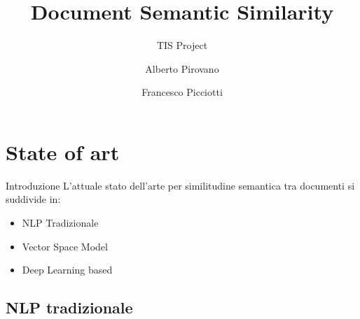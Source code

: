 \documentclass[british]{beamer}
\begin{document}
%
\title[Document Semantic Similarity]
{Document Semantic Similarity}

\subtitle{TIS Project}

\author[A. Pirovano, F. Picciotti]
{Alberto Pirovano \and Francesco Picciotti}





\maketitle

\section{State of art}

\begin{frame}{Introduzione}
	L'attuale stato dell'arte per similitudine semantica tra documenti si suddivide in:
	\begin{itemize}
		\item NLP Tradizionale
		\item Vector Space Model
		\item Deep Learning based 
	\end{itemize}
\end{frame}
	
\subsection{NLP tradizionale}
	
\end{document}
